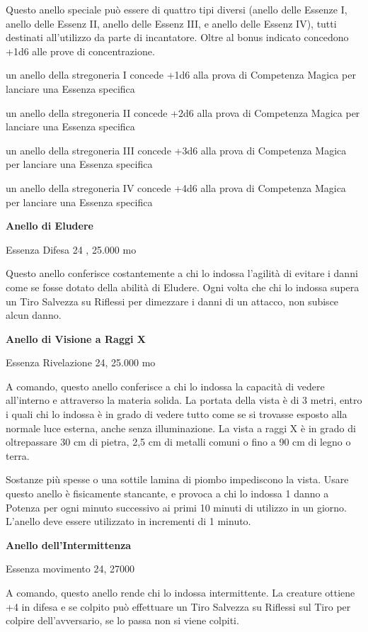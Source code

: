 \documentclass[a4paper,11pt,twoside,openany]{book}
\begin{document}
Questo anello speciale può essere di quattro tipi diversi (anello delle Essenze I, anello delle Essenz II, anello delle Essenz III, e anello delle Essenz IV), tutti destinati all'utilizzo da parte di incantatore. Oltre al bonus indicato concedono +1d6 alle prove di concentrazione.

un anello della stregoneria I concede +1d6 alla prova di Competenza Magica per lanciare una Essenza specifica

un anello della stregoneria II concede +2d6 alla prova di Competenza Magica per lanciare una Essenza specifica

un anello della stregoneria III concede +3d6 alla prova di Competenza Magica per lanciare una Essenza specifica

un anello della stregoneria IV concede +4d6 alla prova di Competenza Magica per lanciare una Essenza specifica

\textbf{Anello di Eludere}

Essenza Difesa 24 , 25.000 mo

Questo anello conferisce costantemente a chi lo indossa l'agilità di evitare i danni come se fosse dotato della abilità di Eludere. Ogni volta che chi lo indossa supera un Tiro Salvezza su Riflessi per dimezzare i danni di un attacco, non subisce alcun danno.

\textbf{Anello di Visione a Raggi X}

Essenza Rivelazione 24, 25.000 mo

A comando, questo anello conferisce a chi lo indossa la capacità di vedere all'interno e attraverso la materia solida. La portata della vista è di 3 metri, entro i quali chi lo indossa è in grado di vedere tutto come se si trovasse esposto alla normale luce esterna, anche senza illuminazione. La vista a raggi X è in grado di oltrepassare 30 cm di pietra, 2,5 cm di metalli comuni o fino a 90 cm di legno o terra.

Sostanze più spesse o una sottile lamina di piombo impediscono la vista. Usare questo anello è fisicamente stancante, e provoca a chi lo indossa 1 danno a Potenza per ogni minuto successivo ai primi 10 minuti di utilizzo in un giorno. L'anello deve essere utilizzato in incrementi di 1 minuto.

\textbf{Anello dell'Intermittenza}

Essenza movimento 24, 27000

A comando, questo anello rende chi lo indossa intermittente. La creature ottiene +4 in difesa e se colpito può effettuare un Tiro Salvezza su Riflessi sul Tiro per colpire dell'avversario, se lo passa non si viene colpiti.
\end{document}
